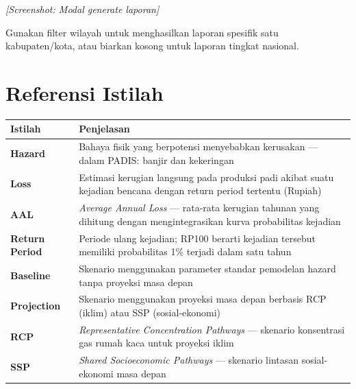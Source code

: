 \documentclass[12pt, a4paper]{article}
\newcommand{\screenshot}[1]{%
    \begin{center}
      \begin{tcolorbox}[
        enhanced,
        colback  = sectiongray,
        colframe = padisborder,
        arc      = 6pt,
        boxrule  = 0.6pt,
        height   = 5.5cm,
        valign   = center,
        halign   = center,
        fontupper = \sffamily\small\color{padismuted},
      ]
        \textit{[Screenshot: #1]}
      \end{tcolorbox}
    \end{center}%
  }
\begin{document}
  \screenshot{Modal generate laporan}

  \begin{tipbox}
    Gunakan filter wilayah untuk menghasilkan laporan spesifik satu kabupaten/kota,
    atau biarkan kosong untuk laporan tingkat nasional.
  \end{tipbox}

  \newpage

  \section{Referensi Istilah}

  \begin{center}
  \begin{tabularx}{\textwidth}{@{} l X @{}}
    \toprule
    \textbf{Istilah}        & \textbf{Penjelasan} \\
    \midrule
    \textbf{Hazard}         & Bahaya fisik yang berpotensi menyebabkan kerusakan —
                              dalam PADIS: banjir dan kekeringan \\[4pt]
    \textbf{Loss}           & Estimasi kerugian langsung pada produksi padi akibat
                              suatu kejadian bencana dengan return period tertentu (Rupiah) \\[4pt]
    \textbf{AAL}            & \textit{Average Annual Loss} — rata-rata kerugian tahunan yang
                              dihitung dengan mengintegrasikan kurva probabilitas kejadian \\[4pt]
    \textbf{Return Period}  & Periode ulang kejadian; RP100 berarti kejadian tersebut
                              memiliki probabilitas 1\% terjadi dalam satu tahun \\[4pt]
    \textbf{Baseline}       & Skenario menggunakan parameter standar pemodelan hazard
                              tanpa proyeksi masa depan \\[4pt]
    \textbf{Projection}     & Skenario menggunakan proyeksi masa depan berbasis RCP
                              (iklim) atau SSP (sosial-ekonomi) \\[4pt]
    \textbf{RCP}            & \textit{Representative Concentration Pathways} — skenario
                              konsentrasi gas rumah kaca untuk proyeksi iklim \\[4pt]
    \textbf{SSP}            & \textit{Shared Socioeconomic Pathways} — skenario
                              lintasan sosial-ekonomi masa depan \\[4pt]

\end{tabularx}
\end{center}
\end{document}
